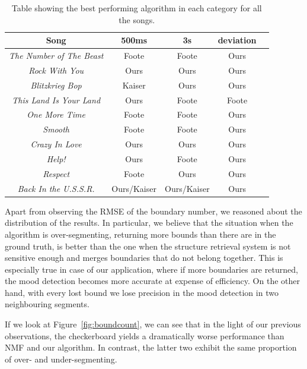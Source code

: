\begin{table}
\begin{center}
\begin{tabular}{| c | c | c | c | c | } \hline 
Song  											& 	500ms 			&  3s						&  deviation	\\ \hline \hline
\textit{The Number of The Beast} 	&	Foote			& 	Foote  				&  Ours 			\\ \hline
\textit{Rock With You}						&	Ours				&  Ours			  		&  Ours			\\ \hline
\textit{Blitzkrieg Bop} 						&	Kaiser			&  Ours  				&  Ours 			\\ \hline
\textit{This Land Is Your Land} 		&	Ours				&  Foote			  	&  Foote 		\\ \hline
\textit{One More Time}					&	Foote			&  Foote    				&  Ours 			\\ \hline
\textit{Smooth}								&	Foote			&  Foote  				&  Ours 			\\ \hline
\textit{Crazy In Love}						&	Ours				&  Ours  				&  Ours  		\\ \hline
\textit{Help!}									&	Ours				&  Foote		   		&  Ours 			\\ \hline
\textit{Respect}								&	Foote			&  Ours  				&  Ours 			\\ \hline
\textit{Back In the U.S.S.R.}				&	Ours/Kaiser	&  Ours/Kaiser 		&  Ours		    	\\ \hline

\end{tabular}
\caption{Table showing the best performing algorithm in each category for all the songs.}
\label{table:evalStructureRank}
\end{center}
\end{table}


Apart from observing the RMSE of the boundary number, we reasoned about the distribution of the results. In particular, we believe that the situation when the algorithm is over-segmenting, returning more bounds than there are in the ground truth, is better than the one when the structure retrieval system is not sensitive enough and merges boundaries that do not belong together. This is especially true in case of our application, where if more boundaries are returned, the mood detection becomes more accurate at expense of efficiency. On the other hand, with every lost bound we lose precision in the mood detection in two neighbouring segments.

If we look at Figure~\ref{fig:boundcount}, we can see that in the light of our previous observations, the checkerboard yields a dramatically worse performance than NMF and our algorithm. In contrast, the latter two exhibit the same proportion of over- and under-segmenting.

